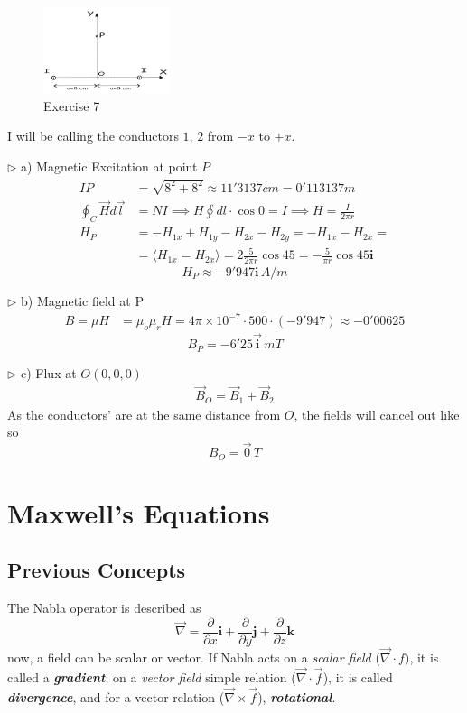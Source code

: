 \documentclass[a4paper]{article}
\begin{document}
\begin{figure}[H]
    \centering
    \includegraphics[width=0.33\textwidth]{IMG/pb7.png}
    \caption{Exercise 7}
    \label{fig:pb7}
\end{figure}

I will be calling the conductors $1,\,2$ from $-x$ to $+x$.

$\triangleright$ a) Magnetic Excitation at point $P$
\begin{align}
\overline{IP}&=\sqrt{ 8^{2}+8^{2} }\approx 11'3137cm=0'113137m \\
\oint_{C}\vec{H}d\vec{l}&=NI\implies H\oint dl\cdot \cos 0=I\implies H=\frac{I}{2\pi r} \\
H_{P}&=-H_{1x}+H_{1y}-H_{2x}-H_{2y}=-H_{1x}-H_{2x}= \\
&=\langle H_{1x}=H_{2x} \rangle=2 \frac{5}{2\pi r}\cos 45=-\frac{5}{\pi r}\cos 45 \mathbf{i}
\end{align}
$$
\boxed{H_{P}\approx-9'947\mathbf{i}\,A / m}
$$

$\triangleright$ b) Magnetic field at P
\begin{align}
B=\mu H & =\mu_{o}\mu_{r}H=4\pi\times 10^{-7}\cdot 500\cdot (-9'947)\approx-0'00625
\end{align}
$$
\boxed{B_{P}=-6'25\Vec{\textbf{i}}\,mT}
$$

$\triangleright$ c) Flux at $O(0,0,0)$
\begin{align}
\Vec{B}_O=\Vec{B}_{1}+\Vec{B}_{2}
\end{align}
As the conductors' are at the same distance from $O$, the fields will cancel out like so
$$
\boxed{B_O=\Vec{0}\,T}
$$


\section{Maxwell's Equations}

\setcounter{equation}{0}
\subsection{Previous Concepts}
\setcounter{equation}{0}
The Nabla operator is described as
$$
\vec{\nabla}=\frac{\partial}{\partial x}\mathbf{i}+\frac{\partial}{\partial y}\mathbf{j}+\frac{\partial}{\partial z}\mathbf{k}
$$
now, a field can be scalar or vector. If Nabla acts on a \textit{scalar field} ($\vec{\nabla}\cdot f)$, it is called a \textbf{\textit{gradient}}; on a \textit{vector field} simple relation ($\vec{\nabla}\cdot\vec{f}$), it is called \textit{\textbf{divergence}}, and for a vector relation ($\vec{\nabla}\times \vec{f}$), \textit{\textbf{rotational}}.
\end{document}
